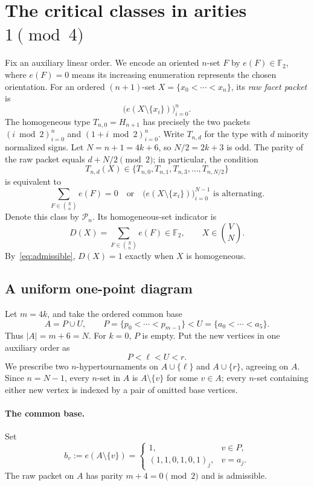 \documentclass[11pt,a4paper]{article}
\theoremstyle{remark}
\newcommand{\F}{\mathbb F_2}
\begin{document}
\section{The critical classes in arities $1\pmod4$}\label{sec:one-four}

Fix an auxiliary linear order. We encode an oriented $n$-set $F$ by
$e(F)\in\F$, where $e(F)=0$ means its increasing enumeration represents
the chosen orientation. For an ordered $(n+1)$-set
$X=\{x_0<\cdots<x_n\}$, its \emph{raw facet packet} is
\[
 \bigl(e(X\setminus\{x_i\})\bigr)_{i=0}^{n}.
\]
The homogeneous type $T_{n,0}=H_{n+1}$ has precisely the two packets
$(i\bmod2)_{i=0}^{n}$ and $(1+i\bmod2)_{i=0}^{n}$. Write
$T_{n,d}$ for the type with $d$ minority normalized signs. Let
$N=n+1=4k+6$, so $N/2=2k+3$ is odd. The parity of the raw packet equals
$d+N/2\pmod2$; in particular, the condition
\[
  T_{n,d}(X)\in\{T_{n,0},T_{n,1},T_{n,3},\ldots,T_{n,N/2}\}
\]
is equivalent to
\begin{equation}\label{eq:admissible}
 \sum_{F\in\binom{X}{n}}e(F)=0
 \quad\text{or}\quad
 \bigl(e(X\setminus\{x_i\})\bigr)_{i=0}^{N-1}
 \text{ is alternating}.
\end{equation}
Denote this class by $\mathcal P_n$. Its homogeneous-set indicator is
\[
 D(X)=\sum_{F\in\binom Xn}e(F)\in\F,
 \qquad X\in\binom V N.
\]
By~\eqref{eq:admissible}, $D(X)=1$ exactly when $X$ is homogeneous.

\subsection{A uniform one-point diagram}

Let $m=4k$, and take the ordered common base
\[
 A=P\cup U,\qquad
 P=\{p_0<\cdots<p_{m-1}\}<
 U=\{a_0<\cdots<a_5\}.
\]
Thus $|A|=m+6=N$. For $k=0$, $P$ is empty. Put the new vertices in
one auxiliary order as
\[
 P<\ell<U<r.
\]
We prescribe two $n$-hypertournaments on $A\cup\{\ell\}$ and
$A\cup\{r\}$, agreeing on $A$. Since $n=N-1$, every $n$-set in
$A$ is $A\setminus\{v\}$ for some $v\in A$; every $n$-set
containing either new vertex is indexed by a pair of omitted base
vertices.

\paragraph{The common base.}
Set
\begin{equation}\label{eq:base}
 b_v:=e(A\setminus\{v\})=
 \begin{cases}
   1,&v\in P,\\
   (1,1,0,1,0,1)_j,&v=a_j.
 \end{cases}
\end{equation}
The raw packet on $A$ has parity $m+4=0\pmod2$ and is admissible.
\end{document}
